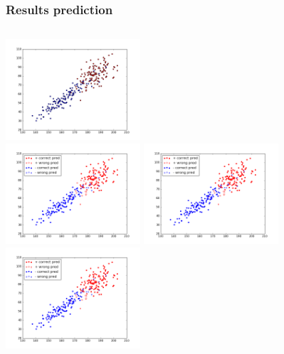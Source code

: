 \documentclass{beamer}
\begin{document}
\begin{frame}
\frametitle{Results prediction}
	\begin{columns}[t]
	\centering
	\includegraphics[width=5cm]{graphics/testWithCorrect}\\
	\includegraphics[width=5cm]{graphics/1NNPrediction}
	\centering
	\includegraphics[width=5cm]{graphics/3NNPrediction}\\
	\includegraphics[width=5cm]{graphics/5NNPrediction}
\end{columns}
\end{frame}
\end{document}
